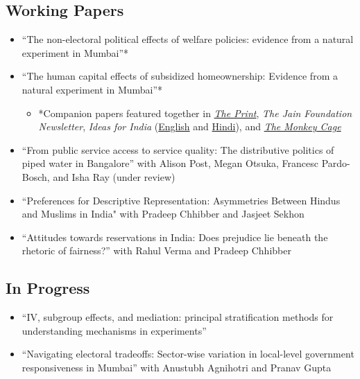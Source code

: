 \documentclass[11pt]{article}
\begin{document}
\subsection*{Working Papers}

\begin{itemize}
	\item[]``The non-electoral political effects of welfare policies: evidence from a natural experiment in Mumbai''* 
	\item[]``The human capital effects of subsidized homeownership: Evidence from a natural experiment in Mumbai''*
	\begin{itemize}
	\item[]*Companion papers featured together in \href{https://theprint.in/opinion/mumbai-residents-win-govt-housing-lottery-and-spend-more-on-kids-education-jobs-study/290485/}{\textit{The Print}}, \textit{The Jain Foundation Newsletter}, \textit{Ideas for India} (\href{https://www.ideasforindia.in/topics/poverty-inequality/household-level-effects-of-affordable-housing-evidence-from-mumbai.html}{English} and \href{https://www.ideasforindia.in/topics/poverty-inequality/household-level-effects-of-affordable-housing-evidence-from-mumbai-hindi.html}{Hindi}), and \href{https://www.washingtonpost.com/news/monkey-cage/wp/2019/01/31/heres-what-gavin-newsom-elizabeth-warren-and-microsoft-should-know-if-want-to-end-the-affordable-housing-crisis/?tid=sm_tw_cage}{\textit{The Monkey Cage}}
	\end{itemize} 	
	
		\item[]``From public service access to service quality: The distributive politics of piped water in Bangalore'' with Alison Post, Megan Otsuka, Francesc Pardo-Bosch, and Isha Ray (under review)
	
		\item[]``Preferences for Descriptive Representation: Asymmetries Between Hindus and Muslims in India" with Pradeep Chhibber and Jasjeet Sekhon 
		\item[]``Attitudes towards reservations in India: Does prejudice lie beneath the rhetoric of fairness?'' with Rahul Verma and Pradeep Chhibber
		\end{itemize}

\subsection*{In Progress}
\begin{itemize}

	\item[]``IV, subgroup effects, and mediation: principal stratification methods for understanding mechanisms in experiments'' 
		\item[]``Navigating electoral tradeoffs: Sector-wise variation in local-level government responsiveness in Mumbai'' with Anustubh Agnihotri and Pranav Gupta


	\end{itemize}
\vspace{3mm}
\end{document}
